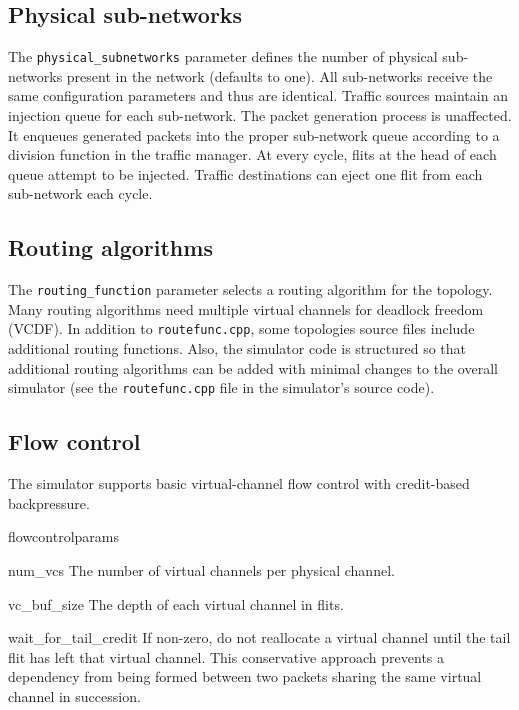 \documentclass[11pt]{article}
\begin{document}
\subsection{Physical sub-networks}
\label{sec:physical_subnets}

The \texttt{physical\_subnetworks} parameter defines the number of physical sub-networks present in the network (defaults to one).
All sub-networks receive the same configuration parameters and thus are identical. Traffic sources
maintain an injection queue for each sub-network. The packet generation process is unaffected. It enqueues generated packets into the
proper sub-network queue according to a division function in the traffic manager. At every cycle, flits at the head of each queue attempt to be injected.
Traffic destinations can eject one flit from each sub-network each cycle.


\subsection{Routing algorithms}
\label{sec:routing_algs}

The \texttt{routing\_function} parameter selects a routing algorithm
for the topology.  Many routing algorithms need multiple virtual
channels for deadlock freedom (VCDF). In addition to \texttt{routefunc.cpp}, some topologies source files include additional routing functions. Also, the simulator code is structured so that additional routing algorithms can be added with minimal changes to the overall simulator (see the \texttt{routefunc.cpp} file in the simulator's source code).

\subsection{Flow control}

The simulator supports basic virtual-channel flow control with
credit-based backpressure.  

\begin{opt_list}{flowcontrolparams}

\item[num\_vcs] The number of virtual channels per physical channel.

\item[vc\_buf\_size] The depth of each virtual channel in flits.


  
\item[wait\_for\_tail\_credit] If non-zero, do not reallocate a virtual
channel until the tail flit has left that virtual channel.  This
conservative approach prevents a dependency from being formed between
two packets sharing the same virtual channel in succession.
\end{opt_list}
\end{document}
